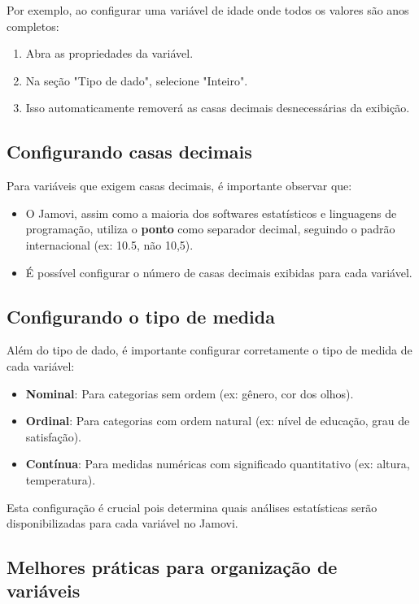 Por exemplo, ao configurar uma variável de idade onde todos os valores são anos completos:

\begin{enumerate}
    \item Abra as propriedades da variável.
    \item Na seção "Tipo de dado", selecione "Inteiro".
    \item Isso automaticamente removerá as casas decimais desnecessárias da exibição.
\end{enumerate}

\subsection{Configurando casas decimais}

Para variáveis que exigem casas decimais, é importante observar que:

\begin{itemize}
    \item O Jamovi, assim como a maioria dos softwares estatísticos e linguagens de programação, utiliza o \textbf{ponto} como separador decimal, seguindo o padrão internacional (ex: 10.5, não 10,5).
    \item É possível configurar o número de casas decimais exibidas para cada variável.
\end{itemize}

\subsection{Configurando o tipo de medida}

Além do tipo de dado, é importante configurar corretamente o tipo de medida de cada variável:

\begin{itemize}
    \item \textbf{Nominal}: Para categorias sem ordem (ex: gênero, cor dos olhos).
    \item \textbf{Ordinal}: Para categorias com ordem natural (ex: nível de educação, grau de satisfação).
    \item \textbf{Contínua}: Para medidas numéricas com significado quantitativo (ex: altura, temperatura).
\end{itemize}

Esta configuração é crucial pois determina quais análises estatísticas serão disponibilizadas para cada variável no Jamovi.

\subsection{Melhores práticas para organização de variáveis}

